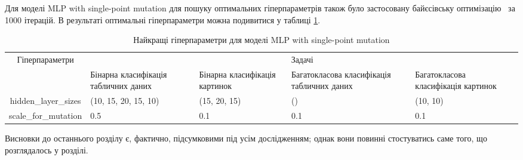 Для моделі MLP with single-point mutation для пошуку оптимальних гіперпараметрів також було застосовану байєсівську оптимізацію~\cite{ct37} за 1000 ітерацій. В результаті оптимальні гіперпараметри можна подивитися у таблиці \ref{tab_hyperparameters_for_mlp_with_sp_mut}.

\begin{table}[ht]
	\caption{Найкращі гіперпараметри для моделі MLP with single-point mutation}
	\label{tab_hyperparameters_for_mlp_with_sp_mut}
	\centering
	\begin{adjustbox}{max width=\textwidth}
		\begin{tabular}{|c|p{3cm}|p{3cm}|p{3cm}|p{3cm}|}
			\hline \multirow{2}{*}{Гіперпараметри} & \multicolumn{4}{c|}{Задачі} \\
			\cline{2-5} & Бінарна класифікація табличних даних & Бінарна класифікація картинок & Багатокласова класифікація табличних даних & Багатокласова класифікація картинок \\
			\hline hidden\_layer\_sizes & (10, 15, 20, 15, 10) & (15, 20, 15) & () & (10, 10) \\
			\hline scale\_for\_mutation & 0.5 & 0.1 & 0.1 & 0.1 \\
			\hline
		\end{tabular}
	\end{adjustbox}
\end{table}

\chapconclude{\ref{chap:practice}}

Висновки до останнього розділу є, фактично, підсумковими під усім 
дослідженням; однак вони повинні стостуватись саме того, що розглядалось у 
розділі.
